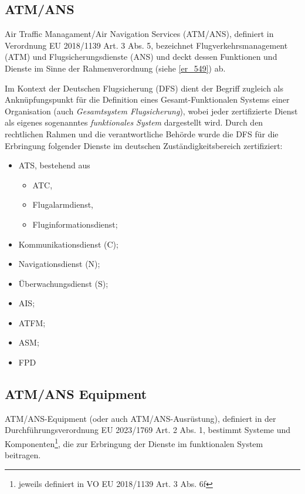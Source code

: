 \subsection{ATM/ANS}

Air Traffic Managament/Air Navigation Services (ATM/ANS), definiert in Verordnung EU 2018/1139 Art. 3 Abs. 5, bezeichnet Flugverkehrsmanagement (ATM) und Flugsicherungsdienste (ANS) und deckt dessen Funktionen und Dienste im Sinne der Rahmenverordnung (siehe \ref{er_549}) ab.


Im Kontext der Deutschen Flugsicherung (DFS) dient der Begriff zugleich als Anknüpfungspunkt für die Definition eines Gesamt-Funktionalen Systems einer Organisation (auch \textit{Gesamtsystem Flugsicherung}), wobei jeder zertifizierte Dienst als eigenes sogenanntes \textit{funktionales System} dargestellt wird.
Durch den rechtlichen Rahmen und die verantwortliche Behörde wurde die DFS für die Erbringung folgender Dienste im deutschen Zuständigkeitsbereich zertifiziert: \cite[17]{ba_technik}
\begin{itemize}
    \item   \acf{ATS}, bestehend aus
    \begin{itemize}
        \item \acf{ATC},
        \item Flugalarmdienst,
        \item Fluginformationsdienst;
    \end{itemize}
    \item  Kommunikationsdienst (C);
    \item  Navigationsdienst (N);
    \item  Überwachungsdienst (S);
    \item  \acf{AIS};
    \item  \acf{ATFM};
    \item  \acf{ASM};
    \item  \acf{FPD}
\end{itemize}

\subsection{ATM/ANS Equipment}

ATM/ANS-Equipment (oder auch ATM/ANS-Ausrüstung), definiert in der Durchführungsverordnung EU 2023/1769 Art. 2 Abs. 1, bestimmt Systeme und Komponenten\footnote{jeweils definiert in VO EU 2018/1139 Art. 3 Abs. 6f}, die zur Erbringung der Dienste im funktionalen System beitragen.